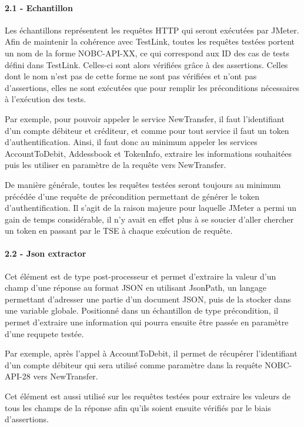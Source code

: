 	\paragraph{2.1 - Echantillon}
	Les échantillons représentent les requêtes HTTP qui seront exécutées par JMeter. Afin de maintenir la cohérence avec TestLink, toutes les requêtes testées portent un nom de la forme NOBC-API-XX, ce qui correspond aux ID des cas de tests défini dans TestLink. Celles-ci sont alors vérifiées grâce à des assertions. Celles dont le nom n'est pas de cette forme ne sont pas vérifiées et n'ont pas d'assertions, elles ne sont exécutées que pour remplir les préconditions nécessaires à l'exécution des tests.
	
	Par exemple, pour pouvoir appeler le service NewTransfer, il faut l'identifiant d'un compte débiteur et créditeur, et comme pour tout service il faut un token d'authentification. Ainsi, il faut donc au minimum appeler les services AccountToDebit, Addessbook et TokenInfo, extraire les informations souhaitées puis les utiliser en paramètre de la requête vers NewTransfer.
	
	De manière générale, toutes les requêtes testées seront toujours au minimum précédée d'une requête de précondition permettant de générer le token d'authentification. Il s'agit de la raison majeure pour laquelle JMeter a permi un gain de temps considérable, il n'y avait en effet plus à se soucier d'aller chercher un token en passant par le TSE à chaque exécution de requête.
	
	\paragraph{2.2 - Json extractor}
	Cet élément est de type post-processeur et permet d'extraire la valeur d'un champ d'une réponse au format JSON en utilisant JsonPath, un langage permettant d'adresser une partie d'un document JSON, puis de la stocker dans une variable globale. Positionné dans un échantillon de type précondition, il permet d'extraire une information qui pourra ensuite être passée en paramètre d'une requpete testée.
	
	Par exemple, après l'appel à AccountToDebit, il permet de récupérer l'identifiant d'un compte débiteur qui sera utilisé comme paramètre dans la requête NOBC-API-28 vers NewTransfer.
	
	Cet élément est aussi utilisé sur les requêtes testées pour extraire les valeurs de tous les champs de la réponse afin qu'ils soient ensuite vérifiés par le biais d'assertions.
	
